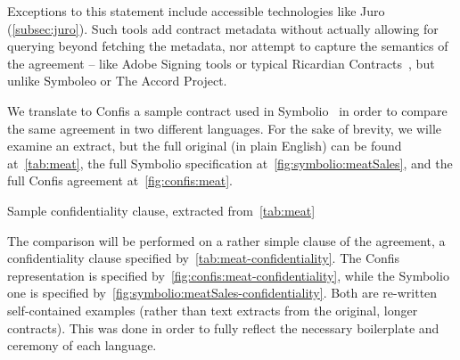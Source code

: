 Exceptions to this statement include accessible technologies like Juro (\autoref{subsec:juro}).
Such tools add contract metadata without actually allowing for querying beyond fetching the metadata, nor attempt to capture the semantics of the agreement -- like Adobe Signing tools or typical Ricardian Contracts~\cite{ricardianWeb}, but unlike Symboleo or The Accord Project.

We translate to Confis a sample contract used in Symbolio~\cite{symboleo2020} in order to compare the same agreement in two different languages.
For the sake of brevity, we wille examine an extract, but the full original (in plain English) can be found at~\autoref{tab:meat}, the full Symbolio specification at~\autoref{fig:symbolio:meatSales}, and the full Confis agreement at~\autoref{fig:confis:meat}.

\begin{table}[h]
    \centering
    \setlength{\fboxsep}{10pt}
    \caption[Sample confidentiality clause]{Sample confidentiality clause, extracted from~\autoref{tab:meat}}
    \label{tab:meat-confidentiality}
\end{table}

The comparison will be performed on a rather simple clause of the agreement, a confidentiality clause specified by~\autoref{tab:meat-confidentiality}.
The Confis representation is specified by~\autoref{fig:confis:meat-confidentiality}, while the Symbolio one is specified by~\autoref{fig:symbolio:meatSales-confidentiality}.
Both are re-written self-contained examples (rather than text extracts from the original, longer contracts).
This was done in order to fully reflect the necessary boilerplate and ceremony of each language.


